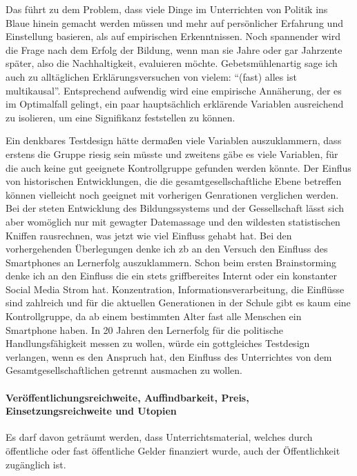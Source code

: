 Das führt zu dem Problem, dass viele Dinge im Unterrichten von Politik ins Blaue hinein gemacht werden müssen und mehr auf persönlicher Erfahrung und Einstellung basieren, als auf empirischen Erkenntnissen.
Noch spannender wird die Frage nach dem Erfolg der Bildung, wenn man sie Jahre oder gar Jahrzente später, also die Nachhaltigkeit, evaluieren möchte. Gebetsmühlenartig sage ich auch zu alltäglichen Erklärungsversuchen von vielem: \enquote{(fast) alles ist multikausal}. Entsprechend aufwendig wird eine empirische Annäherung, der es im Optimalfall gelingt, ein paar hauptsächlich erklärende Variablen ausreichend zu isolieren, um eine Signifikanz feststellen zu können. 

Ein denkbares Testdesign hätte dermaßen viele Variablen auszuklammern, dass erstens die Gruppe riesig sein müsste und zweitens gäbe es viele Variablen, für die auch keine gut geeignete Kontrollgruppe gefunden werden könnte. Der Einflus von historischen Entwicklungen, die die gesamtgesellschaftliche Ebene betreffen können vielleicht noch geeignet mit vorherigen Genrationen verglichen werden. Bei der steten Entwicklung des Bildungssystems und der Gessellschaft lässt sich aber womöglich nur mit gewagter Datemassage und den wildesten statistischen Kniffen rausrechnen, was jetzt wie viel Einfluss gehabt hat. 
Bei den vorhergehenden Überlegungen denke ich \gls{zb} an den Versuch den Einfluss des Smartphones an Lernerfolg auszuklammern. Schon beim ersten Brainstorming denke ich an den Einfluss die ein stets griffbereites Internt oder ein konstanter Social Media Strom hat. Konzentration, Informationsverarbeitung, die Einflüsse sind zahlreich und für die aktuellen Generationen in der Schule gibt es kaum eine Kontrollgruppe, da ab einem bestimmten Alter fast alle Menschen ein Smartphone haben. In 20 Jahren den Lernerfolg für die politische Handlungsfähigkeit messen zu wollen, würde ein gottgleiches Testdesign verlangen, wenn es den Anspruch hat, den Einfluss des Unterrichtes von dem Gesamtgesellschaftlichen getrennt ausmachen zu wollen. 



\paragraph{Veröffentlichungsreichweite, Auffindbarkeit, Preis, Einsetzungsreichweite und Utopien \label{öffi}}

Es darf davon geträumt werden, dass Unterrichtsmaterial, welches durch öffentliche oder fast öffentliche Gelder finanziert wurde, auch der Öffentlichkeit zugänglich ist.

